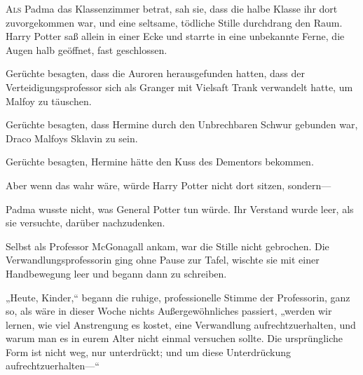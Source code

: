 
\lettrine{A}{ls} Padma das Klassenzimmer betrat, sah sie, dass die halbe Klasse ihr dort zuvorgekommen war, und eine seltsame, tödliche Stille durchdrang den Raum. Harry Potter saß allein in einer Ecke und starrte in eine unbekannte Ferne, die Augen halb geöffnet, fast geschlossen.

Gerüchte besagten, dass die Auroren herausgefunden hatten, dass der Verteidigungsprofessor sich als Granger mit Vielsaft Trank verwandelt hatte, um Malfoy zu täuschen.

Gerüchte besagten, dass Hermine durch den Unbrechbaren Schwur gebunden war, Draco Malfoys Sklavin zu sein.

Gerüchte besagten, Hermine hätte den Kuss des Dementors bekommen.

Aber wenn das wahr wäre, würde Harry Potter nicht dort sitzen, sondern—

Padma wusste nicht, was General Potter tun würde. Ihr Verstand wurde leer, als sie versuchte, darüber nachzudenken.

Selbst als Professor McGonagall ankam, war die Stille nicht gebrochen. Die Verwandlungsprofessorin ging ohne Pause zur Tafel, wischte sie mit einer Handbewegung leer und begann dann zu schreiben.

„Heute, Kinder,“ begann die ruhige, professionelle Stimme der Professorin, ganz so, als wäre in dieser Woche nichts Außergewöhnliches passiert, „werden wir lernen, wie viel Anstrengung es kostet, eine Verwandlung aufrechtzuerhalten, und warum man es in eurem Alter nicht einmal versuchen sollte. Die ursprüngliche Form ist nicht weg, nur unterdrückt; und um diese Unterdrückung aufrechtzuerhalten—“

